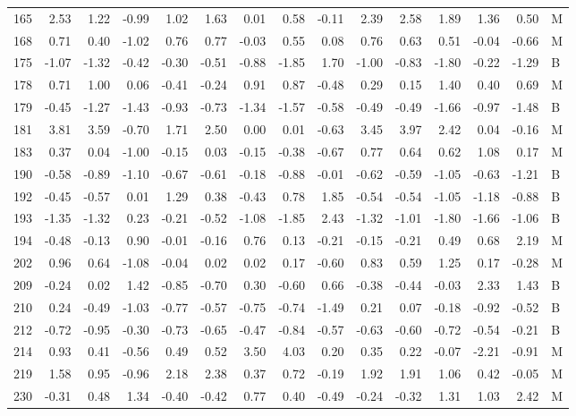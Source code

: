 \begin{table}[ht]
\begin{tabular}{rrrrrrrrrrrrrrl}
  165 & 2.53 & 1.22 & -0.99 & 1.02 & 1.63 & 0.01 & 0.58 & -0.11 & 2.39 & 2.58 & 1.89 & 1.36 & 0.50 & M \\ 
  168 & 0.71 & 0.40 & -1.02 & 0.76 & 0.77 & -0.03 & 0.55 & 0.08 & 0.76 & 0.63 & 0.51 & -0.04 & -0.66 & M \\ 
  175 & -1.07 & -1.32 & -0.42 & -0.30 & -0.51 & -0.88 & -1.85 & 1.70 & -1.00 & -0.83 & -1.80 & -0.22 & -1.29 & B \\ 
  178 & 0.71 & 1.00 & 0.06 & -0.41 & -0.24 & 0.91 & 0.87 & -0.48 & 0.29 & 0.15 & 1.40 & 0.40 & 0.69 & M \\ 
  179 & -0.45 & -1.27 & -1.43 & -0.93 & -0.73 & -1.34 & -1.57 & -0.58 & -0.49 & -0.49 & -1.66 & -0.97 & -1.48 & B \\ 
  181 & 3.81 & 3.59 & -0.70 & 1.71 & 2.50 & 0.00 & 0.01 & -0.63 & 3.45 & 3.97 & 2.42 & 0.04 & -0.16 & M \\ 
  183 & 0.37 & 0.04 & -1.00 & -0.15 & 0.03 & -0.15 & -0.38 & -0.67 & 0.77 & 0.64 & 0.62 & 1.08 & 0.17 & M \\ 
  190 & -0.58 & -0.89 & -1.10 & -0.67 & -0.61 & -0.18 & -0.88 & -0.01 & -0.62 & -0.59 & -1.05 & -0.63 & -1.21 & B \\ 
  192 & -0.45 & -0.57 & 0.01 & 1.29 & 0.38 & -0.43 & 0.78 & 1.85 & -0.54 & -0.54 & -1.05 & -1.18 & -0.88 & B \\ 
  193 & -1.35 & -1.32 & 0.23 & -0.21 & -0.52 & -1.08 & -1.85 & 2.43 & -1.32 & -1.01 & -1.80 & -1.66 & -1.06 & B \\ 
  194 & -0.48 & -0.13 & 0.90 & -0.01 & -0.16 & 0.76 & 0.13 & -0.21 & -0.15 & -0.21 & 0.49 & 0.68 & 2.19 & M \\ 
  202 & 0.96 & 0.64 & -1.08 & -0.04 & 0.02 & 0.02 & 0.17 & -0.60 & 0.83 & 0.59 & 1.25 & 0.17 & -0.28 & M \\ 
  209 & -0.24 & 0.02 & 1.42 & -0.85 & -0.70 & 0.30 & -0.60 & 0.66 & -0.38 & -0.44 & -0.03 & 2.33 & 1.43 & B \\ 
  210 & 0.24 & -0.49 & -1.03 & -0.77 & -0.57 & -0.75 & -0.74 & -1.49 & 0.21 & 0.07 & -0.18 & -0.92 & -0.52 & B \\ 
  212 & -0.72 & -0.95 & -0.30 & -0.73 & -0.65 & -0.47 & -0.84 & -0.57 & -0.63 & -0.60 & -0.72 & -0.54 & -0.21 & B \\ 
  214 & 0.93 & 0.41 & -0.56 & 0.49 & 0.52 & 3.50 & 4.03 & 0.20 & 0.35 & 0.22 & -0.07 & -2.21 & -0.91 & M \\ 
  219 & 1.58 & 0.95 & -0.96 & 2.18 & 2.38 & 0.37 & 0.72 & -0.19 & 1.92 & 1.91 & 1.06 & 0.42 & -0.05 & M \\ 
  230 & -0.31 & 0.48 & 1.34 & -0.40 & -0.42 & 0.77 & 0.40 & -0.49 & -0.24 & -0.32 & 1.31 & 1.03 & 2.42 & M \\ 

\end{tabular}
\end{table}
